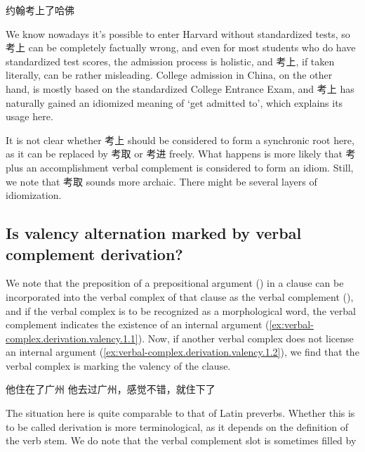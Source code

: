 \documentclass[UTF8, a4paper, oneside, scheme=plain, 12pt]{ctexrep}
\newcommand{\translate}[1]{`#1'}
\begin{document}
\begin{exe}
    \ex 约翰考上了哈佛
\end{exe}

We know nowadays it's possible to enter Harvard without standardized tests,
so 考上 can be completely factually wrong,
and even for most students who do have standardized test scores,
the admission process is holistic, and 考上, if taken literally,
can be rather misleading.
College admission in China, on the other hand, is mostly based on the standardized College Entrance Exam,
and 考上 has naturally gained an idiomized meaning of \translate{get admitted to},
which explains its usage here.

It is not clear whether 考上 should be considered to form a synchronic root here,
as it can be replaced by 考取 or 考进 freely.
What happens is more likely that 考 plus an accomplishment verbal complement is considered to form an idiom.
Still, we note that 考取 sounds more archaic.
There might be several layers of idiomization.

\subsection{Is valency alternation marked by verbal complement derivation?}\label{sec:verbal-complex.derivation.valency}

We note that the preposition of a prepositional argument  
() in a clause
can be incorporated into the verbal complex of that clause
as the verbal complement (),
and if the verbal complex is to be recognized as a morphological word,
the verbal complement indicates the existence of an internal argument
(\ref{ex:verbal-complex.derivation.valency.1.1}).
Now, if another verbal complex does not license an internal argument 
(\ref{ex:verbal-complex.derivation.valency.1.2}),
we find that the verbal complex is marking the valency of the clause.

\begin{exe}
    \ex\label{ex:verbal-complex.derivation.valency.1} \begin{xlist}
        \ex\label{ex:verbal-complex.derivation.valency.1.1} 他住在了广州
        \ex\label{ex:verbal-complex.derivation.valency.1.2} 他去过广州，感觉不错，就住下了
    \end{xlist}
\end{exe}

The situation here is quite comparable to that of Latin preverbs.
Whether this is to be called derivation is more terminological,
as it depends on the definition of the verb stem.
We do note that the verbal complement slot is sometimes filled by 
\end{document}
